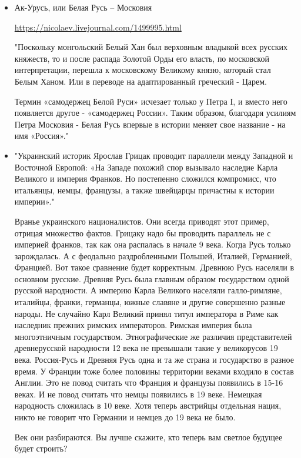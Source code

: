\begin{itemize}
\item {}

Ак-Урусь, или Белая Русь – Московия

\url{https://nicolaev.livejournal.com/1499995.html}

"Поскольку монгольский Белый Хан был верховным владыкой всех русских княжеств,
то и после распада Золотой Орды его власть, по московской интерпретации,
перешла к московскому Великому князю, который стал Белым Ханом. Или в переводе
на адаптированный греческий - Царем.

Термин «самодержец Белой Руси» исчезает только у Петра I, и вместо него
появляется другое - «самодержец России». Таким образом, благодаря усилиям Петра
Московия - Белая Русь впервые в истории меняет свое название - на имя
«Россия»."

\item {}

"Украинский историк Ярослав Грицак проводит параллели между Западной и
Восточной Европой: «На Западе похожий спор вызывало наследие Карла Великого и
империя Франков. Но постепенно сложился компромисс, что итальянцы, немцы,
французы, а также швейцарцы причастны к истории империи»."

Вранье украинского националистов. Они всегда приводят этот пример, отрицая
множество фактов. Грицаку надо бы проводить параллель не с империей франков,
так как она распалась в начале 9 века. Когда Русь только зарождалась. А с
феодально раздробленными Польшей, Италией, Германией, Францией. Вот такое
сравнение будет корректным. Древнюю Русь населяли в основном русские. Древняя
Русь была главным образом государством одной русской народности. А империю
Карла Великого населяли галло-римляне, италийцы, франки, германцы, южные
славяне и другие совершенно разные народы. Не случайно Карл Великий принял
титул императора в Риме как наследник прежних римских императоров. Римская
империя была многоэтничным государством. Этнографические же различия
представителей древнерусской народности 12 века не превышали такие у
великорусов 19 века. Россия-Русь и Древняя Русь одна и та же страна и
государство в разное время. У Франции тоже более половины территории веками
входило в состав Англии. Это не повод считать что Франция и французы появились
в 15-16 веках. И не повод считать что немцы появились в 19 веке. Немецкая
народность сложилась в 10 веке. Хотя теперь австрийцы отдельная нация, никто не
говорит что Германии и немцев до 19 века не было.

Век они разбираются. Вы лучше скажите, кто теперь вам светлое будущее будет строить? 

\end{itemize}
